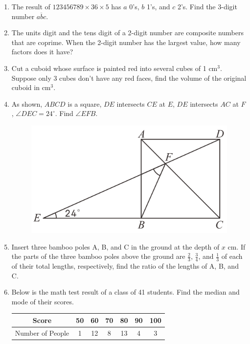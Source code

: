 \documentclass[11pt]{scrartcl}
\begin{document}
\begin{enumerate}
    \item The result of $123456789 \times 36 \times 5$ has $a$ 0's, $b$ 1's, and $c$ 2's. Find the 3-digit number $\overline{abc}$.

    \item The units digit and the tens digit of a 2-digit number are composite numbers that are coprime. When the 2-digit number has the largest value, how many factors does it have?
    
    \item Cut a cuboid whose surface is painted red into several cubes of 1 cm$^3$. Suppose only 3 cubes don't have any red faces, find the volume of the original cuboid in cm$^3$.
    
    \item As shown, $ABCD$ is a square, $DE$ intersects $CE$ at $E$, $DE$ intersects $AC$ at $F$, $\angle DEC = 24^\circ$. Find $\angle EFB$.
    \begin{figure}[h]
        \centering
        \includegraphics[scale=0.43]{StarGen/0Figure/geometry-wmi-2023-g5.png}
    \end{figure}
    
    \item Insert three bamboo poles A, B, and C in the ground at the depth of $x$ cm. If the parts of the three bamboo poles above the ground are $\frac{2}{3}$, $\frac{3}{4}$, and $\frac{1}{3}$ of each of their total lengths, respectively, find the ratio of the lengths of A, B, and C.
    
    \item Below is the math test result of a class of 41 students. Find the median and mode of their scores.\\
    
    \begin{tabular}{|c|c|c|c|c|c|c|}
    \hline
    Score & 50 & 60 & 70 & 80 & 90 & 100 \\
    \hline
    Number of People & 1 & 12 & 8 & 13 & 4 & 3 \\
    \hline
    \end{tabular}
    

\end{enumerate}
\end{document}
